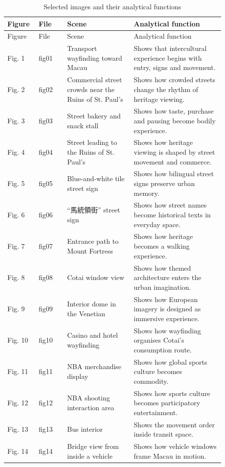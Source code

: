 \documentclass[12pt,a4paper]{article}
\begin{document}
\begin{longtable}{>{\raggedright\arraybackslash}p{0.1\linewidth}>{\raggedright\arraybackslash}p{0.12\linewidth}>{\raggedright\arraybackslash}p{0.28\linewidth}>{\raggedright\arraybackslash}p{0.38\linewidth}}
\caption{Selected images and their analytical functions}\\
\toprule
Figure & File & Scene & Analytical function \\
\midrule
\endfirsthead
\toprule
Figure & File & Scene & Analytical function \\
\midrule
\endhead
Fig. 1 & fig01 & Transport wayfinding toward Macau & Shows that intercultural experience begins with entry, signs and movement. \\
Fig. 2 & fig02 & Commercial street crowds near the Ruins of St. Paul's & Shows how crowded streets change the rhythm of heritage viewing. \\
Fig. 3 & fig03 & Street bakery and snack stall & Shows how taste, purchase and pausing become bodily experience. \\
Fig. 4 & fig04 & Street leading to the Ruins of St. Paul's & Shows how heritage viewing is shaped by street movement and commerce. \\
Fig. 5 & fig05 & Blue-and-white tile street sign & Shows how bilingual street signs preserve urban memory. \\
Fig. 6 & fig06 & ``馬統領街'' street sign & Shows how street names become historical texts in everyday space. \\
Fig. 7 & fig07 & Entrance path to Mount Fortress & Shows how heritage becomes a walking experience. \\
Fig. 8 & fig08 & Cotai window view & Shows how themed architecture enters the urban imagination. \\
Fig. 9 & fig09 & Interior dome in the Venetian & Shows how European imagery is designed as immersive experience. \\
Fig. 10 & fig10 & Casino and hotel wayfinding & Shows how wayfinding organises Cotai's consumption route. \\
Fig. 11 & fig11 & NBA merchandise display & Shows how global sports culture becomes commodity. \\
Fig. 12 & fig12 & NBA shooting interaction area & Shows how sports culture becomes participatory entertainment. \\
Fig. 13 & fig13 & Bus interior & Shows the movement order inside transit space. \\
Fig. 14 & fig14 & Bridge view from inside a vehicle & Shows how vehicle windows frame Macau in motion. \\
\bottomrule
\end{longtable}
\end{document}
